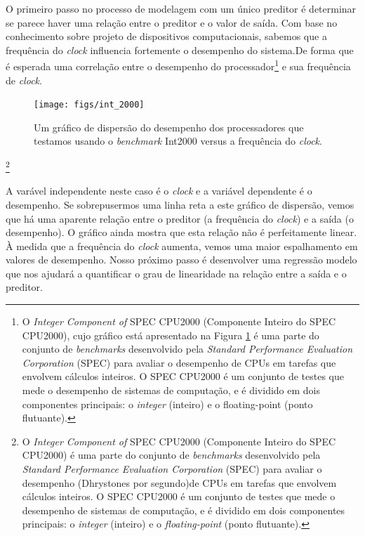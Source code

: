 \documentclass[article]{memoir}
\begin{document}
{O primeiro passo no processo de modelagem com um único preditor é determinar se parece haver uma relação  entre o preditor e o valor de saída. Com base no conhecimento sobre projeto de dispositivos computacionais, sabemos que a frequência do \textit{clock} influencia fortemente o desempenho do sistema.De forma que é esperada uma correlação entre o desempenho do processador\footnote{O \textit{Integer Component of} SPEC CPU2000 (Componente Inteiro do SPEC CPU2000), cujo gráfico está apresentado na Figura \ref{fig:slrint2000} é uma parte do conjunto de \textit{benchmarks} desenvolvido pela \textit{Standard Performance Evaluation Corporation} (SPEC) para avaliar o desempenho de CPUs em tarefas que envolvem cálculos inteiros. O SPEC CPU2000 é um conjunto de testes que mede o desempenho de sistemas de computação, e é dividido em dois componentes principais: o \textit{integer} (inteiro) e o floating-point (ponto flutuante).} e sua frequência de \textit{clock}. 

\begin{figure}[ht]
	\centering
	\texttt{[image: figs/int\_2000]}
	\caption{Um gráfico de dispersão do desempenho dos processadores que testamos
		usando o \textit{benchmark} Int2000 versus a frequência do \textit{clock}.}
	\label{fig:slrint2000}
\end{figure}

\footnote{O \textit{Integer Component of} SPEC CPU2000 (Componente Inteiro do SPEC CPU2000) é uma parte do conjunto de \textit{benchmarks} desenvolvido pela \textit{Standard Performance Evaluation Corporation} (SPEC) para avaliar o desempenho (Dhrystones por segundo\cite{gray2000benchmark})de CPUs em tarefas que envolvem cálculos inteiros. O SPEC CPU2000 é um conjunto de testes que mede o desempenho de sistemas de computação, e é dividido em dois componentes principais: o \textit{integer} (inteiro) e o \textit{floating-point} (ponto flutuante).}

A varável independente neste caso é o \textit{clock} e a variável dependente é o desempenho. Se sobrepusermos uma linha reta a este gráfico de dispersão, vemos que há uma aparente relação entre o preditor (a frequência do \textit{clock}) e a saída (o desempenho). O gráfico ainda mostra que esta relação não é perfeitamente linear. À medida que a frequência do \textit{clock} aumenta, vemos uma maior espalhamento em valores de desempenho. Nosso próximo passo é desenvolver uma regressão modelo que nos ajudará a quantificar o grau de linearidade na relação entre a saída e o preditor.

}
\end{document}
